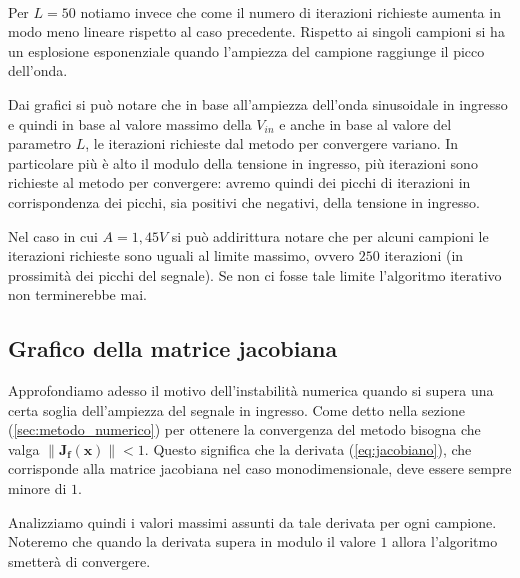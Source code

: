 			\quad\\

			Per $L = 50$ notiamo invece che come il numero di iterazioni richieste aumenta in modo meno lineare rispetto al caso precedente. Rispetto ai singoli campioni si ha un esplosione esponenziale quando l'ampiezza del campione raggiunge il picco dell'onda.
			\graficospace
			\graficospace
			
			Dai grafici si può notare che in base all'ampiezza dell'onda sinusoidale in ingresso e quindi in base al valore massimo della $V_{in}$ e anche in base al valore del parametro $L$, le iterazioni richieste dal metodo per convergere variano. In particolare più è alto il modulo della tensione in ingresso, più iterazioni sono richieste al metodo per convergere: avremo quindi dei picchi di iterazioni in corrispondenza dei picchi, sia positivi che negativi, della tensione in ingresso.
			
			Nel caso in cui $A = 1,45V$ si può addirittura notare che per alcuni campioni le iterazioni richieste sono uguali al limite massimo, ovvero $250$ iterazioni (in prossimità dei picchi del segnale). Se non ci fosse tale limite l'algoritmo iterativo non terminerebbe mai.
			\pagebreak
			
		\subsection{Grafico della matrice jacobiana}
			Approfondiamo adesso il motivo dell'instabilità numerica quando si supera una certa soglia dell'ampiezza del segnale in ingresso. Come detto nella sezione (\ref{sec:metodo_numerico}) per ottenere la convergenza del metodo bisogna che valga $\lVert\mathbf{J_{f}(x)}\rVert < 1$. Questo significa che la derivata (\ref{eq:jacobiano}), che corrisponde alla matrice jacobiana nel caso monodimensionale, deve essere sempre minore di $1$.
			
			Analizziamo quindi i valori massimi assunti da tale derivata per ogni campione. Noteremo che quando la derivata supera in modulo il valore $1$ allora l'algoritmo smetterà di convergere.
			
			\graficospace
			\graficospace
			\graficospace
			
